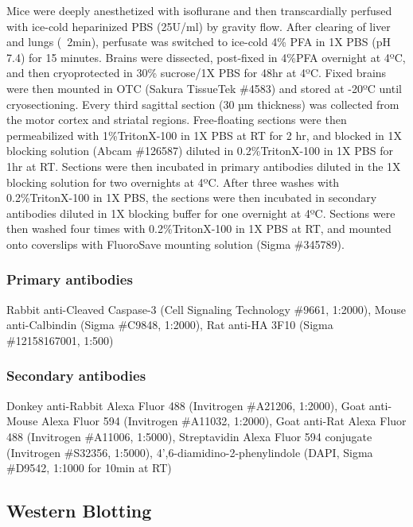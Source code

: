Mice were deeply anesthetized with isoflurane and then transcardially perfused
with ice-cold heparinized PBS (25U/ml) by gravity flow. After clearing of liver
and lungs (~2min), perfusate was switched to ice-cold 4\% PFA in 1X PBS (pH 7.4)
for 15 minutes. Brains were dissected, post-fixed in 4\%PFA overnight at 4ºC,
and then cryoprotected in 30\% sucrose/1X PBS for 48hr at 4ºC. Fixed brains were
then mounted in OTC (Sakura TissueTek \#4583) and stored at -20ºC until
cryosectioning. Every third sagittal section (30 µm thickness) was collected
from the motor cortex and striatal regions. Free-floating sections were then
permeabilized with 1\%TritonX-100 in 1X PBS at RT for 2 hr, and blocked in 1X
blocking solution (Abcam \#126587) diluted in 0.2\%TritonX-100 in 1X PBS for 1hr
at RT. Sections were then incubated in primary antibodies diluted in the 1X
blocking solution for two overnights at 4ºC. After three washes with
0.2\%TritonX-100 in 1X PBS, the sections were then incubated in secondary
antibodies diluted in 1X blocking buffer for one overnight at 4ºC. Sections were
then washed four times with 0.2\%TritonX-100 in 1X PBS at RT, and mounted onto
coverslips with FluoroSave mounting solution (Sigma \#345789). 

\subsubsection{Primary antibodies} Rabbit anti-Cleaved Caspase-3 (Cell
Signaling Technology \#9661, 1:2000), Mouse anti-Calbindin (Sigma \#C9848,
1:2000), Rat anti-HA 3F10 (Sigma \#12158167001, 1:500)

\subsubsection{Secondary antibodies} Donkey anti-Rabbit Alexa Fluor 488
(Invitrogen \#A21206, 1:2000), Goat anti-Mouse Alexa Fluor 594 (Invitrogen
\#A11032, 1:2000), Goat anti-Rat Alexa Fluor 488 (Invitrogen \#A11006, 1:5000),
Streptavidin Alexa Fluor 594 conjugate (Invitrogen \#S32356, 1:5000),
4',6-diamidino-2-phenylindole (DAPI, Sigma \#D9542, 1:1000 for 10min at RT)

\subsection{Western Blotting}

